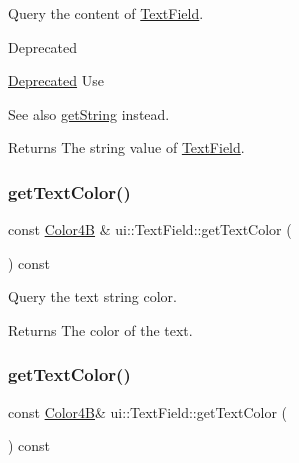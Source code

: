 Query the content of \hyperlink{classui_1_1TextField}{Text\+Field}. \begin{DoxyRefDesc}{Deprecated}
\item[\hyperlink{deprecated__deprecated000399}{Deprecated}]Use\end{DoxyRefDesc}
\begin{DoxySeeAlso}{See also}
{\ttfamily \hyperlink{classui_1_1TextField_aba3ac805a106d31c280b864f970eb2e1}{get\+String}} instead. 
\end{DoxySeeAlso}
\begin{DoxyReturn}{Returns}
The string value of \hyperlink{classui_1_1TextField}{Text\+Field}. 
\end{DoxyReturn}
\mbox{\label{classui_1_1TextField_ad600c0cf6492150b1f7fd736540f6aa7}} 
\subsubsection{\texorpdfstring{get\+Text\+Color()}{getTextColor()}\hspace{0.1cm}{\footnotesize\ttfamily [1/2]}}
{\footnotesize\ttfamily const \hyperlink{structColor4B}{Color4B} \& ui\+::\+Text\+Field\+::get\+Text\+Color (\begin{DoxyParamCaption}{ }\end{DoxyParamCaption}) const}



Query the text string color. 

\begin{DoxyReturn}{Returns}
The color of the text. 
\end{DoxyReturn}
\mbox{\label{classui_1_1TextField_a364cbb46e77eec715bd6fdfb05c428d6}} 
\subsubsection{\texorpdfstring{get\+Text\+Color()}{getTextColor()}\hspace{0.1cm}{\footnotesize\ttfamily [2/2]}}
{\footnotesize\ttfamily const \hyperlink{structColor4B}{Color4B}\& ui\+::\+Text\+Field\+::get\+Text\+Color (\begin{DoxyParamCaption}{ }\end{DoxyParamCaption}) const}



